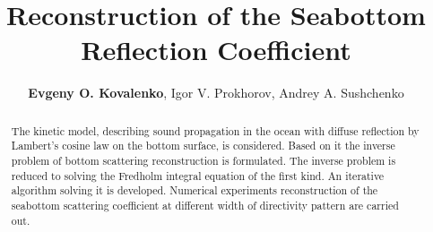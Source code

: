 \documentclass{procDDs}
\title{Reconstruction of the Seabottom Reflection Coefficient}
\author{\textbf{Evgeny O. Kovalenko}, Igor V. Prokhorov, Andrey A. Sushchenko}%
{Institute for Applied Mathematics, FEB RAS, Vladivostok, Russia, \\ 
	Far Eastern Federal University, Vladivostok, Russia}                 %
{kovalenko.eo@dvfu.ru, sushchenko.aa@dvfu.ru}                                   %
\begin{document}
\maketitle

%
\def\k{\mathbf{k}}
\def\n{\mathbf{n}}
\def\x{\mathbf{x}}
\def\y{\mathbf{y}}
\def\r{\mathbf{r}}
\def\p{\mathbf{|}}
\def\z{\mathbf{z}}
\def\V{\mathbf{V}}
\def\Vt{\mathbf{V}t}
\def\exp{\text{exp}}

\begin{abstract}
	The kinetic model, describing sound propagation in the ocean with diffuse reflection by Lambert's cosine law on the bottom surface, is considered. Based on it the inverse problem of bottom scattering reconstruction is formulated.
	The inverse problem is reduced to solving the Fredholm integral equation of the first kind. An iterative algorithm solving it is developed. Numerical experiments reconstruction of the seabottom scattering coefficient at different width of directivity pattern are carried out.
\end{abstract}
\end{document}

